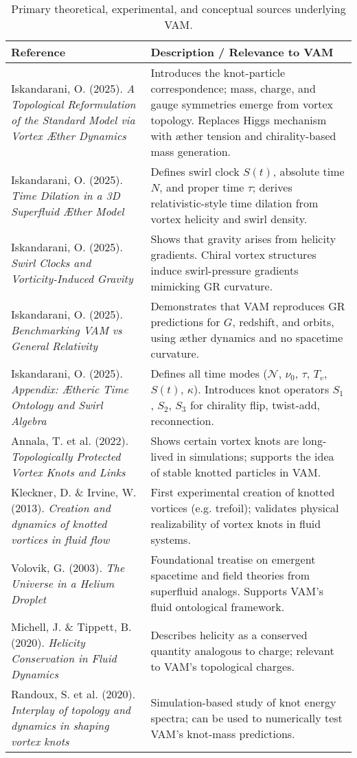 \documentclass[12pt]{article}
\begin{document}
\begin{table}[h!]
\centering
\begin{tabular}{|p{5.2cm}|p{9.5cm}|}
\hline
\textbf{Reference} & \textbf{Description / Relevance to VAM} \\
\hline
Iskandarani, O. (2025). \textit{A Topological Reformulation of the Standard Model via Vortex Æther Dynamics}~\cite{iskandarani2025vam5} & Introduces the knot-particle correspondence; mass, charge, and gauge symmetries emerge from vortex topology. Replaces Higgs mechanism with æther tension and chirality-based mass generation. \\
\hline
Iskandarani, O. (2025). \textit{Time Dilation in a 3D Superfluid Æther Model}~\cite{iskandarani2025vam1} & Defines swirl clock $S(t)$, absolute time $N$, and proper time $\tau$; derives relativistic-style time dilation from vortex helicity and swirl density. \\
\hline
Iskandarani, O. (2025). \textit{Swirl Clocks and Vorticity-Induced Gravity}~\cite{iskandarani2025vam2} & Shows that gravity arises from helicity gradients. Chiral vortex structures induce swirl-pressure gradients mimicking GR curvature. \\
\hline
Iskandarani, O. (2025). \textit{Benchmarking VAM vs General Relativity}~\cite{iskandarani2025VAM3} & Demonstrates that VAM reproduces GR predictions for $G$, redshift, and orbits, using æther dynamics and no spacetime curvature. \\
\hline
Iskandarani, O. (2025). \textit{Appendix: Ætheric Time Ontology and Swirl Algebra}~\cite{iskandarani2025vam2} & Defines all time modes ($\mathcal{N}$, $\nu_0$, $\tau$, $T_v$, $S(t)$, $\kappa$). Introduces knot operators $S_1$, $S_2$, $S_3$ for chirality flip, twist-add, reconnection. \\
\hline
Annala, T. et al. (2022). \textit{Topologically Protected Vortex Knots and Links} & Shows certain vortex knots are long-lived in simulations; supports the idea of stable knotted particles in VAM. \\
\hline
Kleckner, D. \& Irvine, W. (2013). \textit{Creation and dynamics of knotted vortices in fluid flow} & First experimental creation of knotted vortices (e.g. trefoil); validates physical realizability of vortex knots in fluid systems. \\
\hline
Volovik, G. (2003). \textit{The Universe in a Helium Droplet} & Foundational treatise on emergent spacetime and field theories from superfluid analogs. Supports VAM’s fluid ontological framework. \\
\hline
Michell, J. \& Tippett, B. (2020). \textit{Helicity Conservation in Fluid Dynamics} & Describes helicity as a conserved quantity analogous to charge; relevant to VAM's topological charges. \\
\hline
Randoux, S. et al. (2020). \textit{Interplay of topology and dynamics in shaping vortex knots} & Simulation-based study of knot energy spectra; can be used to numerically test VAM’s knot-mass predictions. \\
\hline
\end{tabular}
\caption{Primary theoretical, experimental, and conceptual sources underlying VAM.}
\end{table}



\ifdefined\standalonechapter\else
    
    
    
\end{document}
